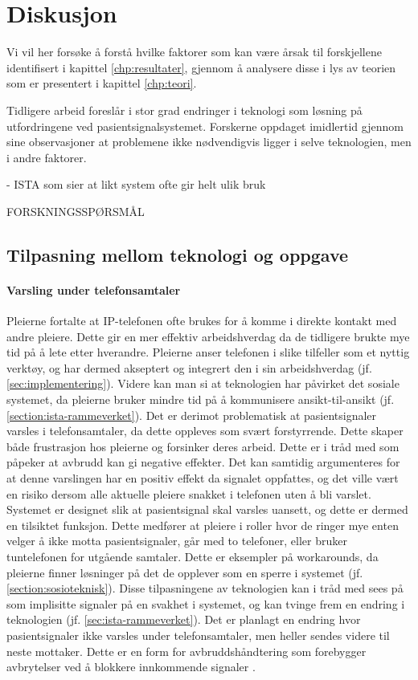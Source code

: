 \chapter{Diskusjon}
\label{chp:diskusjon}

Vi vil her forsøke å forstå hvilke faktorer som kan være årsak til forskjellene identifisert i kapittel \ref{chp:resultater}, gjennom å analysere disse i lys av teorien som er presentert i kapittel \ref{chp:teori}. 

\noindent
Tidligere arbeid foreslår i stor grad endringer i teknologi som løsning på utfordringene ved pasientsignalsystemet. Forskerne oppdaget imidlertid gjennom sine observasjoner at problemene ikke nødvendigvis ligger i selve teknologien, men i andre faktorer. 

- ISTA som sier at likt system ofte gir helt ulik bruk

FORSKNINGSSPØRSMÅL

\section{Tilpasning mellom teknologi og oppgave}	

\subsubsection{Varsling under telefonsamtaler}
Pleierne fortalte at IP-telefonen ofte brukes for å komme i direkte kontakt med andre pleiere. Dette gir en mer effektiv arbeidshverdag da de tidligere brukte mye tid på å lete etter hverandre. Pleierne anser telefonen i slike tilfeller som et nyttig verktøy, og har dermed akseptert og integrert den i sin arbeidshverdag (jf. \ref{sec:implementering}). Videre kan man si at teknologien har påvirket det sosiale systemet, da pleierne bruker mindre tid på å kommunisere ansikt-til-ansikt (jf. \ref{section:ista-rammeverket}). Det er derimot problematisk at pasientsignaler varsles i telefonsamtaler, da dette oppleves som svært forstyrrende. Dette skaper både frustrasjon hos pleierne og forsinker deres arbeid. Dette er i tråd med \citet{Grundgeiger09} som påpeker at avbrudd kan gi negative effekter. Det kan samtidig argumenteres for at denne varslingen har en positiv effekt da signalet oppfattes, og det ville vært en risiko dersom alle aktuelle pleiere snakket i telefonen uten å bli varslet. Systemet er designet slik at pasientsignal skal varsles uansett, og dette er dermed en tilsiktet funksjon. Dette medfører at pleiere i roller hvor de ringer mye enten velger å ikke motta pasientsignaler, går med to telefoner, eller bruker tuntelefonen for utgående samtaler. Dette er eksempler på workarounds, da pleierne finner løsninger på det de opplever som en sperre i systemet (jf. \ref{section:sosioteknisk}). Disse tilpasningene av teknologien kan i tråd med \citet{Coiera07} sees på som implisitte signaler på en svakhet i systemet, og kan tvinge frem en endring i teknologien (jf. \ref{sec:ista-rammeverket}). Det er planlagt en endring hvor pasientsignaler ikke varsles under telefonsamtaler, men heller sendes videre til neste mottaker. Dette er en form for avbruddshåndtering som forebygger avbrytelser ved å blokkere innkommende signaler \citep{Grandhi10}.
	
